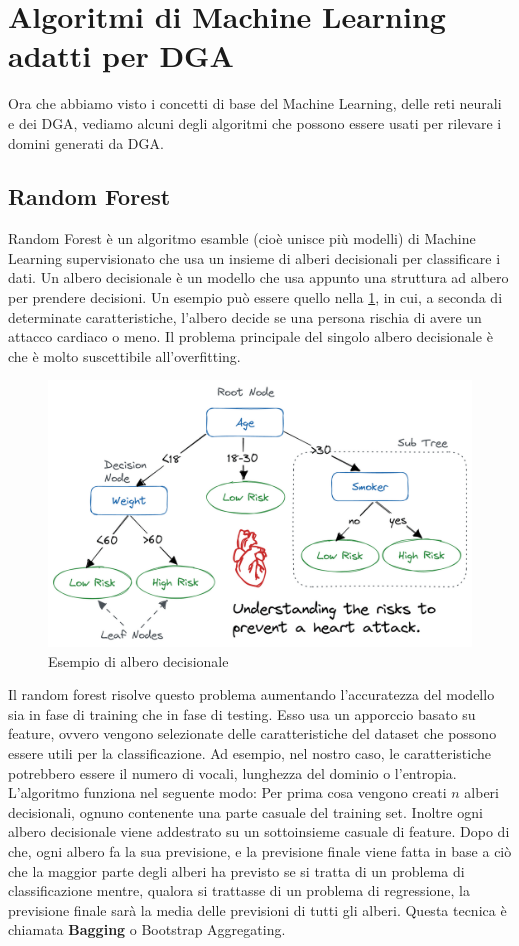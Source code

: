 \documentclass[12pt,a4paper,openright,twoside]{book}
\begin{document}
\section{Algoritmi di Machine Learning adatti per DGA}

Ora che abbiamo visto i concetti di base del Machine Learning, delle reti neurali
e dei DGA, vediamo alcuni degli algoritmi che possono essere usati
per rilevare i domini generati da DGA.

\subsection{Random Forest}

Random Forest è un algoritmo esamble (cioè unisce più modelli) di Machine Learning supervisionato
che usa un insieme di alberi decisionali
per classificare i dati. Un albero decisionale è un modello che usa appunto una struttura ad albero
per prendere decisioni. Un esempio può essere quello nella \cref{fig:decision tree}, in cui, a seconda di determinate
caratteristiche, l'albero decide se una persona rischia di avere un attacco cardiaco o meno.
Il problema principale del singolo albero decisionale è che è molto suscettibile
all'overfitting.
\begin{figure}[H]
    \centering
    \includegraphics[width=.8\linewidth]{figures/Decision_tree_for_heart_attack.png}
    \caption{Esempio di albero decisionale \cite{decision_tree_image}}
    \label{fig:decision tree}
\end{figure}

\noindent Il random forest risolve questo problema aumentando 
l'accuratezza del modello sia in fase di training che in fase di testing. \cite{598994}
Esso usa un apporccio basato su feature, ovvero vengono selezionate
delle caratteristiche del dataset che possono essere utili per la classificazione.
Ad esempio, nel nostro caso, le caratteristiche potrebbero essere
il numero di vocali, lunghezza del dominio o l'entropia.
L'algoritmo funziona nel seguente modo:
Per prima cosa vengono creati $n$ alberi decisionali, ognuno
contenente una parte casuale del training set. Inoltre
ogni albero decisionale viene addestrato su un sottoinsieme casuale
di feature. Dopo di che, ogni albero fa la sua previsione,
e la previsione finale viene fatta in base a ciò che la maggior parte
degli alberi ha previsto se si tratta di un problema di classificazione mentre, qualora si trattasse di un problema di regressione,
la previsione finale sarà la media delle previsioni di tutti gli alberi.
Questa tecnica è chiamata \textbf{Bagging} o Bootstrap Aggregating.
\end{document}
